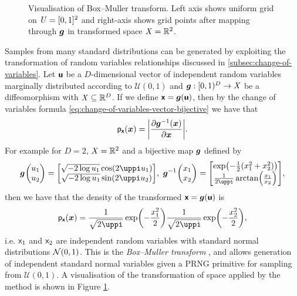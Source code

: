 \begin{figure}
\def\numgrid{11}
\caption[Visualisation of Box--Muller transform.]{Visualisation of Box--Muller transform. Left axis shows uniform grid on $\mathit{U} = [0,1]^2$ and right-axis shows grid points after mapping through $\boldsymbol{g}$ in transformed space $\mathit{X} = \mathbb{R}^2$.}
\label{fig:box-muller-transform}
\end{figure}
\enlargethispage{1\baselineskip}
Samples from many standard distributions can be generated by exploiting the transformation of random variables relationships discussed in \ref{subsec:change-of-variables}. Let $\boldsymbol{\mathsf{u}}$ be a $D$-dimensional vector of independent random variables marginally distributed according to $\mathcal{U}(0,1)$ and $\boldsymbol{g} :  [0,1)^D \to \mathit{X}$ be a diffeomorphism with $\mathit{X} \subseteq \mathbb{R}^D$. If we define $\boldsymbol{\mathsf{x}} = \boldsymbol{g}(\boldsymbol{\mathsf{u}})$, then by the change of variables formula \eqref{eq:change-of-variables-vector-bijective} we have that
\begin{equation}\label{eq:transform-sampling-uniform}
  \pden{\rvct{x}}(\vct{x}) = \left|\pd{\vct{g}^{-1}(\vct{x})}{\vct{x}}\right|.
\end{equation}
For example for $D=2$, $\mathit{X} = \mathbb{R}^2$ and a bijective map $\boldsymbol{g}$ defined by
\begin{equation*}\label{eq:box-muller-transform}
\begin{split}
  \vct{g}\kern0.5pt\begin{pmatrix} u_1\\u_2\end{pmatrix} =
  \begin{bmatrix} \sqrt{-2\log u_1}\cos(2\uppi u_1) \\ \sqrt{-2\log u_1}\sin(2\uppi u_2)\end{bmatrix}
  ,~
  \vct{g}^{-1}\kern0.5pt\begin{pmatrix} x_1\\x_2\end{pmatrix} =
  \begin{bmatrix} \exp\lpa-\frac{1}{2}(x_1^2+x_2^2)\rpa \\ \frac{1}{2\uppi}\arctan\lpa\frac{x_1}{x_2}\rpa\end{bmatrix},
\end{split}
\end{equation*}
then we have that the density of the transformed $\boldsymbol{\mathsf{x}} = \boldsymbol{g}(\boldsymbol{\mathsf{u}})$ is
\begin{equation}\label{eq:box-muller-transform-density}
  \pden{\rvct{x}}(\vct{x}) = 
  \frac{1}{\sqrt{2\uppi}}\exp\lpa-\frac{x_1^2}{2}\rpa
  \frac{1}{\sqrt{2\uppi}}\exp\lpa-\frac{x_2^2}{2}\rpa ,
\end{equation}
i.e. $\mathsf{x}_1$ and $\mathsf{x}_2$ are independent random variables with standard normal distributions $\nrm{0,1}$. This is the \emph{Box--Muller transform} \citep{box1958note}, and allows generation of independent standard normal variables given a \ac{PRNG} primitive for sampling from $\mathcal{U}(0,1)$. A visualisation of the transformation of space applied by the method is shown in Figure \ref{fig:box-muller-transform}. 

